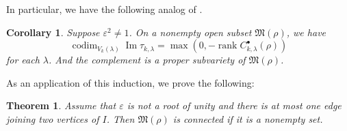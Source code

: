 \documentclass[12pt]{amsart}
\def\frak{\mathfrak}
\newtheorem{Theorem}[equation]{Theorem}
\newtheorem{Corollary}[equation]{Corollary}
\theoremstyle{definition}
\theoremstyle{remark}
\numberwithin{equation}{subsection}
\newcommand{\Ima}{\operatorname{Im}}
\newcommand{\rank}{\operatorname{rank}}
\newcommand{\M}{{\frak M}} %
\newcommand{\codim}{\operatorname{codim}} %
\begin{document}
In particular, we have the following analog of \cite[4.6]{Na-alg}.
\begin{Corollary}\label{cor:codim_rank}
Suppose $\varepsilon^2\neq 1$.
On a nonempty open subset $\M(\rho)$, we have
\begin{equation*}
    \codim_{V_k(\lambda)} \Ima \tau_{k,\lambda}
   = \max\left(0, -\rank C_{k,\lambda}^\bullet(\rho)\right)
\end{equation*}
for each $\lambda$.
And the complement is a proper subvariety of $\M(\rho)$.
\end{Corollary}

As an application of this induction, we prove the following:
\begin{Theorem}\label{thm:M(rho)_conn}
Assume that $\varepsilon$ is not a root of unity and there is at most
one edge joining two vertices of $I$.
%
Then $\M(\rho)$ is connected if it is a nonempty set.
\end{Theorem}
\end{document}
